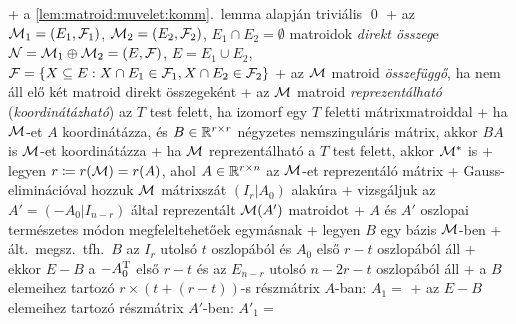   + \proof a \ref{lem:matroid:muvelet:komm}.~lemma alapján triviális
    \qed
+ \dfn az $\mathcal{M}_1 = (E_1, \mathcal{F}_1)$, $\mathcal{M}_2 = (E_2, \mathcal{F}_2)$, $E_1 \cap
  E_2 = \emptyset$ matroidok \emph{direkt összeg}e $\mathcal{N} = \mathcal{M}_1 \oplus
  \mathcal{M}_2 = (E, \mathcal{F})$, $E = E_1 \cup E_2$, $\mathcal{F} = \{ X \subseteq E : X
  \cap E_1 \in \mathcal{F}_1, X \cap E_2 \in \mathcal{F}_2 \}$
+ \dfn az $\mathcal{M}$ matroid \emph{összefüggő}, ha nem áll elő két matroid
  direkt összegeként
+ \dfn az $\mathcal{M}$ matroid \emph{reprezentálható}
  (\emph{koordinátázható}) az $T$ test felett, ha izomorf egy $T$
  feletti mátrixmatroiddal
  + ha $\mathcal{M}$-et $A$ koordinátázza, és $B \in \mathbb{R}^{r \times r}$
    négyzetes nemszinguláris mátrix, akkor $BA$ is $\mathcal{M}$-et
    koordinátázza
+ \thm \label{thm:matroid:muvelet:dualrep}ha $\mathcal{M}$ reprezentálható a $T$ test felett, akkor $\mathcal{M}^*$ is
  + \proof legyen $r \coloneqq r(\mathcal{M}) = r(A)$, ahol $A \in \mathbb{R}^{r
    \times n}$ az $\mathcal{M}$-et reprezentáló mátrix
    + Gauss-eliminációval hozzuk $\mathcal{M}$ mátrixszát $(I_r | A_0)$
      alakúra
  + vizsgáljuk az $A' = (-A_0 | I_{n - r})$ által reprezentált
    $\mathcal{M}(A')$ matroidot
    + $A$ és $A'$ oszlopai természetes módon megfeleltehetőek egymásnak
    + legyen $B$ egy bázis $\mathcal{M}$-ben
      + ált.~megsz.~tfh.~$B$ az $I_r$ utolsó $t$ oszlopából és $A_0$
        első $r - t$ oszlopából áll
      + ekkor $E - B$ a $-A_0^{\mathrm{T}}$ első $r - t$ és az $E_{n - r}$
        utolsó $n - 2r - t$ oszlopából áll
      + a $B$ elemeihez tartozó $r \times (t + (r - t))$-s részmátrix $A$-ban: $A_1 =$
      + az $E - B$ elemeihez tartozó részmátrix $A'$-ben: $A'_1 =$
